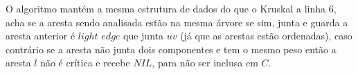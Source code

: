 \noindent O algoritmo mantém a mesma estrutura de dados do que o Kruskal a linha 6, acha se a aresta sendo analisada estão na mesma árvore se sim, junta e guarda a aresta anterior é $light$ $edge$ que junta $uv$ (já que as arestas estão ordenadas), caso contrário se a aresta não junta dois componentes e tem o mesmo peso então a aresta $l$ não é crítica e recebe $NIL$, para não ser inclusa em $C$.\\[6pt]